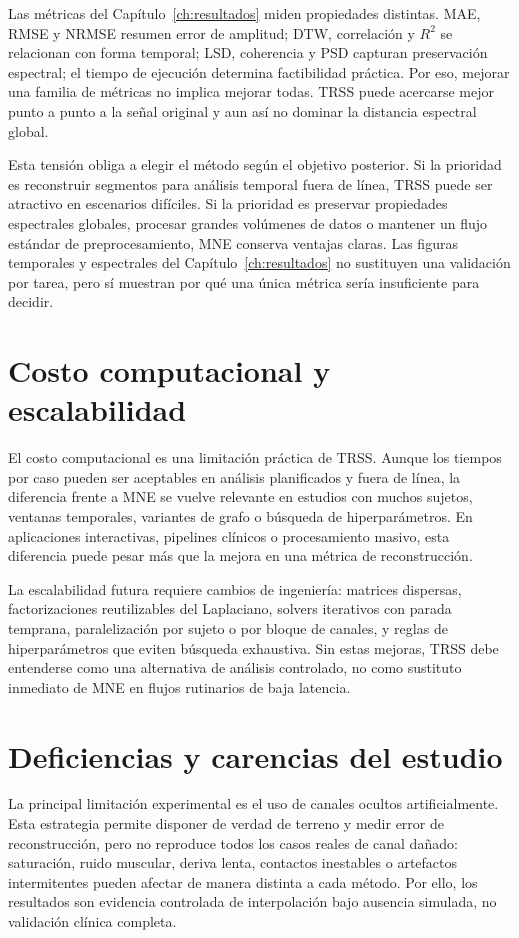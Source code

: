Las métricas del Capítulo~\ref{ch:resultados} miden propiedades distintas. MAE, RMSE y NRMSE resumen error de amplitud; DTW, correlación y $R^2$ se relacionan con forma temporal; LSD, coherencia y PSD capturan preservación espectral; el tiempo de ejecución determina factibilidad práctica. Por eso, mejorar una familia de métricas no implica mejorar todas. TRSS puede acercarse mejor punto a punto a la señal original y aun así no dominar la distancia espectral global.

Esta tensión obliga a elegir el método según el objetivo posterior. Si la prioridad es reconstruir segmentos para análisis temporal fuera de línea, TRSS puede ser atractivo en escenarios difíciles. Si la prioridad es preservar propiedades espectrales globales, procesar grandes volúmenes de datos o mantener un flujo estándar de preprocesamiento, MNE conserva ventajas claras. Las figuras temporales y espectrales del Capítulo~\ref{ch:resultados} no sustituyen una validación por tarea, pero sí muestran por qué una única métrica sería insuficiente para decidir.

\section{Costo computacional y escalabilidad}

El costo computacional es una limitación práctica de TRSS. Aunque los tiempos por caso pueden ser aceptables en análisis planificados y fuera de línea, la diferencia frente a MNE se vuelve relevante en estudios con muchos sujetos, ventanas temporales, variantes de grafo o búsqueda de hiperparámetros. En aplicaciones interactivas, pipelines clínicos o procesamiento masivo, esta diferencia puede pesar más que la mejora en una métrica de reconstrucción.

La escalabilidad futura requiere cambios de ingeniería: matrices dispersas, factorizaciones reutilizables del Laplaciano, solvers iterativos con parada temprana, paralelización por sujeto o por bloque de canales, y reglas de hiperparámetros que eviten búsqueda exhaustiva. Sin estas mejoras, TRSS debe entenderse como una alternativa de análisis controlado, no como sustituto inmediato de MNE en flujos rutinarios de baja latencia.

\section{Deficiencias y carencias del estudio}

La principal limitación experimental es el uso de canales ocultos artificialmente. Esta estrategia permite disponer de verdad de terreno y medir error de reconstrucción, pero no reproduce todos los casos reales de canal dañado: saturación, ruido muscular, deriva lenta, contactos inestables o artefactos intermitentes pueden afectar de manera distinta a cada método. Por ello, los resultados son evidencia controlada de interpolación bajo ausencia simulada, no validación clínica completa.

